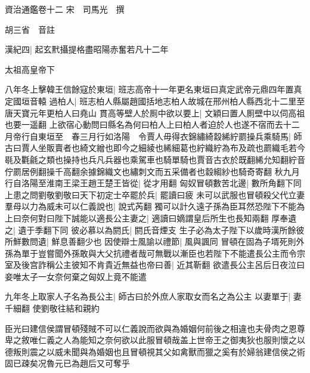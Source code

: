 資治通鑑卷十二
宋　司馬光　撰

胡三省　音註

漢紀四|{
	起玄黓攝提格盡昭陽赤奮若凡十二年}


太祖高皇帝下

八年冬上擊韓王信餘寇於東垣|{
	班志高帝十一年更名東垣曰真定武帝元鼎四年置真定國垣音轅}
過柏人|{
	班志柏人縣屬趙國括地志柏人故城在邢州柏人縣西北十二里至唐天寶元年更柏人曰堯山}
貫高等壁人於厠中欲以要上|{
	文穎曰置人厠壁中以伺高祖也要一遥翻}
上欲宿心動問曰縣名為何曰柏人上曰柏人者迫於人也遂不宿而去十二月帝行自東垣至　春三月行如洛陽　令賈人毋得衣錦繡綺縠絺紵罽操兵乘騎馬|{
	師古曰賈人坐販賣者也綺文繒也即今之細綾也絺細葛也紵織紵為布及疏也罽織毛若今毼及氍毹之類也操持也兵凡兵器也乘駕車也騎單騎也賈音古衣於既翻絺允知翻紵音佇罽居例翻操千高翻余據錦織文也繡刺文而五采備者也縠縐紗也騎奇寄翻}
秋九月行自洛陽至淮南王梁王趙王楚王皆從|{
	從才用翻}
匈奴冒頓數苦北邊|{
	數所角翻下同}
上患之問劉敬劉敬曰天下初定士卒罷於兵|{
	罷讀曰疲}
未可以武服也冒頓殺父代立妻羣母以力為威未可以仁義說也|{
	說式芮翻}
獨可以計久遠子孫為臣耳然恐陛下不能為上曰奈何對曰陛下誠能以適長公主妻之|{
	適讀曰嫡謂皇后所生也長知兩翻}
厚奉遺之|{
	遺于季翻下同}
彼必慕以為閼氏|{
	閼氏音煙支}
生子必為太子陛下以歲時漢所餘彼所鮮數問遺|{
	鮮息善翻少也}
因使辯士風諭以禮節|{
	風與諷同}
冒頓在固為子壻死則外孫為單于豈嘗聞外孫敢與大父抗禮者哉可無戰以漸臣也若陛下不能遣長公主而令宗室及後宫詐稱公主彼知不肯貴近無益也帝曰善|{
	近其靳翻}
欲遣長公主呂后日夜泣曰妾唯太子一女奈何棄之匈奴上竟不能遣

九年冬上取家人子名為長公主|{
	師古曰於外庶人家取女而名之為公主}
以妻單于|{
	妻千細翻}
使劉敬往結和親約

臣光曰建信侯謂冒頓殘賊不可以仁義說而欲與為婚姻何前後之相違也夫骨肉之恩尊卑之敘唯仁義之人為能知之奈何欲以此服冒頓哉盖上世帝王之御夷狄也服則懷之以德叛則震之以威未聞與為婚姻也且冒頓視其父如禽獸而獵之奚有於婦翁建信侯之術固已疎矣况魯元已為趙后又可奪乎


